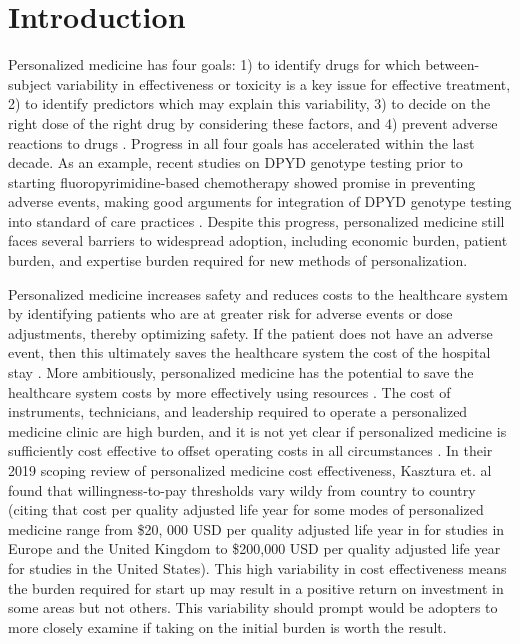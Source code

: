 \section{Introduction}

Personalized medicine has four goals: 1) to identify drugs for which between-subject variability in effectiveness or toxicity is a key issue for effective treatment, 2) to identify predictors which may explain this variability, 3) to decide on the right dose of the right drug by considering these factors, and 4) prevent adverse reactions to drugs \cite{morse2015personalized}.  Progress in all four goals has accelerated within the last decade. As an example, recent studies on DPYD genotype testing prior to starting fluoropyrimidine-based chemotherapy showed promise in preventing adverse events, making good arguments for integration of DPYD genotype testing into standard of care practices \cite{wigle2019prospective}. Despite this progress, personalized medicine still faces several barriers to widespread adoption, including economic burden, patient burden, and expertise burden required for new methods of personalization.


Personalized medicine increases safety and reduces costs to the healthcare system by identifying patients who are at greater risk for adverse events or dose adjustments, thereby optimizing safety.  If the patient does not have an adverse event, then this ultimately saves the healthcare system the cost of the hospital stay \cite{looff2016economic}.  More ambitiously, personalized medicine has the potential to save the healthcare system costs by more effectively using resources \cite{shabaruddin2015economic}. The cost of instruments, technicians, and leadership required to operate a personalized medicine clinic are high burden, and it is not yet clear if personalized medicine is sufficiently cost effective to offset operating costs in all circumstances \cite{kasztura2019cost}.  In their 2019 scoping review of personalized medicine cost effectiveness, Kasztura et. al \cite{kasztura2019cost} found that willingness-to-pay thresholds vary wildy from country to country (citing that cost per quality adjusted life year for some modes of personalized medicine range from \$20, 000 USD per quality adjusted life year in for studies in Europe and the United Kingdom to \$200,000 USD per quality adjusted life year for studies in the United States).  This high variability in cost effectiveness means the burden required for start up may result in a positive return on investment in some areas but not others. This variability should prompt would be adopters to more closely examine if taking on the initial burden is worth the result.


